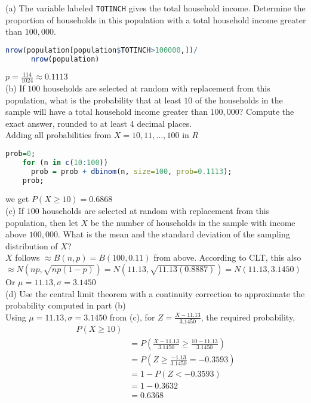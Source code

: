 \documentclass[boxes, qed]{homework}
\begin{document}
\begin{solution}(a) The variable labeled \texttt{TOTINCH} gives the total household income. Determine the proportion of
  households in this population with a total household income greater than $100,000$.
  \begin{lstlisting}[backgroundcolor = \color{lightgray},language = R]
    nrow(population[population$TOTINCH>100000,])/
      nrow(population)
  \end{lstlisting}
  $\boxed{p=\frac{114}{1024}\approx{0.1113}}$\\

  (b) If $100$ households are selected at random with replacement from this population, what is the
  probability that at least $10$ of the households in the sample will have a total household income greater
  than $100,000$? Compute the exact answer, rounded to at least 4 decimal places.\\

  Adding all probabilities from $X=10, 11, \dots, 100$ in $R$
  \begin{lstlisting}[backgroundcolor = \color{lightgray},language = R]
    prob=0; 
    for (n in c(10:100)) 
      prob = prob + dbinom(n, size=100, prob=0.1113); 
    prob;
  \end{lstlisting}
  we get $\boxed{P(X\ge{10}) = 0.6868}$\\

  (c) If $100$ households are selected at random with replacement from this population, then let $X$ be
  the number of households in the sample with income above $100,000$. What is the mean and the standard
  deviation of the sampling distribution of $X$?\\

  $X$ follows $\approx B(n,p) = B(100,0.11)$ from above.
  According to CLT, this also $\approx N(np,\sqrt{np(1-p)}) 
    =N(11.13,\sqrt{11.13(0.8887)})
    =N(11.13,3.1450)$\\

  Or $\mu=11.13, \sigma=3.1450$\\
  
  (d) Use the central limit theorem with a continuity correction to approximate the probability
  computed in part (b)\\
  
  Using $\mu=11.13, \sigma=3.1450$ from (c),
  for $Z=\frac{X-11.13}{3.1450}$, the required probability,
  \begin{align*}
    P(X\ge{10})\\
    &= P(\frac{X-11.13}{3.1450}\ge{\frac{10-11.13}{3.1450}})\\
    &= P(Z\ge\frac{-1.13}{3.1450}=-0.3593)\\
    &= 1-P(Z<-0.3593)\\
    &= 1-0.3632\\
    &= \boxed{0.6368}
  \end{align*}

\end{solution}
\end{document}
